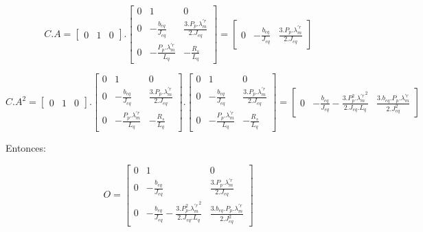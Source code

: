 \documentclass{article}
\begin{document}
\begin{equation*}
    C.A = 
    \begin{bmatrix}
        0 & 1 & 0
    \end{bmatrix}.
    \begin{bmatrix}
        0 & 1 & 0 \\
        0 & -\frac{b_{eq}}{J_{eq}} & \frac{3.P_p.\lambda_m^{\prime r}}{2.J_{eq}} \\
        0 & -\frac{P_p.\lambda_m^{\prime r}}{L_q} & -\frac{R_s}{L_q}
    \end{bmatrix}
    =
    \begin{bmatrix}
        0 & -\frac{b_{eq}}{J_{eq}} & \frac{3.P_p.\lambda_m^{\prime r}}{2.J_{eq}}
    \end{bmatrix}
\end{equation*}

\begin{equation*}
    C.A^2 =
    \begin{bmatrix}
        0 & 1 & 0
    \end{bmatrix}.
    \begin{bmatrix}
        0 & 1 & 0 \\
        0 & -\frac{b_{eq}}{J_{eq}} & \frac{3.P_p.\lambda_m^{\prime r}}{2.J_{eq}} \\
        0 & -\frac{P_p.\lambda_m^{\prime r}}{L_q} & -\frac{R_s}{L_q}
    \end{bmatrix}.
    \begin{bmatrix}
        0 & 1 & 0 \\
        0 & -\frac{b_{eq}}{J_{eq}} & \frac{3.P_p.\lambda_m^{\prime r}}{2.J_{eq}} \\
        0 & -\frac{P_p.\lambda_m^{\prime r}}{L_q} & -\frac{R_s}{L_q}
    \end{bmatrix}
    =
    \begin{bmatrix}
        0 & -\frac{b_{eq}}{J_{eq}} - \frac{3.P_p^2.{\lambda_m^{\prime r}}^2}{2.J_{eq}.L_q} & \frac{3.b_{eq}.P_p.\lambda_m^{\prime r}}{2.J_{eq}^2}
    \end{bmatrix}
\end{equation*}

Entonces: 

\begin{equation*}
    O = 
    \begin{bmatrix}
        0 & 1 & 0 \\
        0 & -\frac{b_{eq}}{J_{eq}} & \frac{3.P_p.\lambda_m^{\prime r}}{2.J_{eq}} \\
        0 & -\frac{b_{eq}}{J_{eq}} - \frac{3.P_p^2.{\lambda_m^{\prime r}}^2}{2.J_{eq}.L_q} & \frac{3.b_{eq}.P_p.\lambda_m^{\prime r}}{2.J_{eq}^2}
    \end{bmatrix}
\end{equation*}
\end{document}
